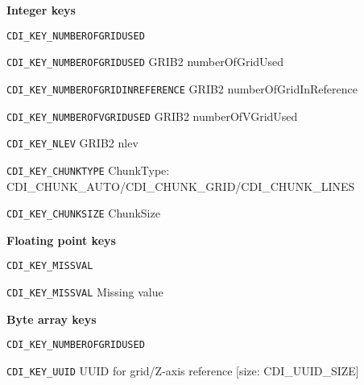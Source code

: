 \textbf{Integer keys}

\vspace*{3mm}
\hspace*{8mm}\begin{minipage}{15cm}
\begin{deflist}{\large\texttt{CDI\_KEY\_NUMBEROFGRIDUSED \ \ }}
\item[\large\texttt{CDI\_KEY\_NUMBEROFGRIDUSED}]   GRIB2 numberOfGridUsed
\item[\large\texttt{CDI\_KEY\_NUMBEROFGRIDINREFERENCE}]   GRIB2 numberOfGridInReference
\item[\large\texttt{CDI\_KEY\_NUMBEROFVGRIDUSED}]   GRIB2 numberOfVGridUsed
\item[\large\texttt{CDI\_KEY\_NLEV}]   GRIB2 nlev
\item[\large\texttt{CDI\_KEY\_CHUNKTYPE}]   ChunkType: CDI\_CHUNK\_AUTO/CDI\_CHUNK\_GRID/CDI\_CHUNK\_LINES
\item[\large\texttt{CDI\_KEY\_CHUNKSIZE}]   ChunkSize
\end{deflist}
\end{minipage}
\vspace*{4mm}

\textbf{Floating point keys}

\vspace*{3mm}
\hspace*{8mm}\begin{minipage}{15cm}
\begin{deflist}{\large\texttt{CDI\_KEY\_MISSVAL \ \ }}
\item[\large\texttt{CDI\_KEY\_MISSVAL}]   Missing value
\end{deflist}
\end{minipage}
\vspace*{4mm}

\textbf{Byte array keys}

\vspace*{3mm}
\hspace*{8mm}\begin{minipage}{15cm}
\begin{deflist}{\large\texttt{CDI\_KEY\_NUMBEROFGRIDUSED \ \ }}
\item[\large\texttt{CDI\_KEY\_UUID}]   UUID for grid/Z-axis reference [size: CDI\_UUID\_SIZE]
\end{deflist}
\end{minipage}
\vspace*{4mm}
